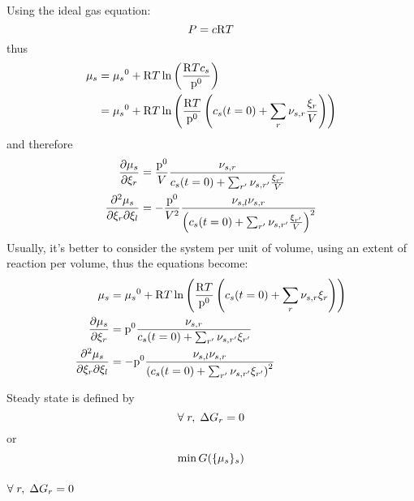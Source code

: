 Using the ideal gas equation:
\begin{equation}
\Press = \conc \Rg \Temp
\end{equation}
thus
\begin{equation}
\begin{split}
\chempot[s] & = \chempotZ[s] + \Rg\Temp\ln\left(\frac{\Rg \Temp \molar[s]}{\pz}\right) \\
            & = \chempotZ[s] + \Rg\Temp\ln\left(\frac{\Rg \Temp}{\pz}\left(\molar[s](t=0) + \sum_r \scoef[s,r]\frac{\ext[r]}{\Vol}\right)\right) \\
\end{split}
\end{equation}
and therefore
\begin{equation}
\begin{split}
\doverdext[r]{\chempot[s]}      & = \frac{\pz}{\Vol}\frac{\scoef[s,r]}{\molar[s](t=0) + \sum_{r'} \scoef[s,r']\frac{\ext[r']}{\Vol}}\\
\ddoverddext{\chempot[s]}{r}{l} & = -\frac{\pz}{\Vol^2}\frac{\scoef[s,l]\scoef[s,r]}{\left(\molar[s](t=0) + \sum_{r'} \scoef[s,r']\frac{\ext[r']}{\Vol}\right)^2}\\
\end{split}
\end{equation}
Usually, it's better to consider the system per unit of volume, 
using an extent of reaction per volume, thus the equations
become:
\begin{equation}
\begin{split}
\chempot[s]                     & = \chempotZ[s] + \Rg\Temp\ln\left(\frac{\Rg \Temp}{\pz}\left(\molar[s](t=0) + \sum_r \scoef[s,r]\ext[r]\right)\right) \\
\doverdext[r]{\chempot[s]}      & = \pz\frac{\scoef[s,r]}{\molar[s](t=0) + \sum_{r'} \scoef[s,r']\ext[r']}\\
\ddoverddext{\chempot[s]}{r}{l} & = -\pz\frac{\scoef[s,l]\scoef[s,r]}{\left(\molar[s](t=0) + \sum_{r'} \scoef[s,r']\ext[r']\right)^2}\\
\end{split}
\end{equation}

Steady state is defined by 
\begin{equation}
\forall\; r,\; \DGibbs_r = 0
\end{equation} 
or 
\begin{equation}
\min \Gibbs(\{\chempot[s]\}_s)
\end{equation}

\subsubsection{\texorpdfstring{$\forall\;r,\;\DGibbs_r = 0$}{Reaction enthalpy}}

